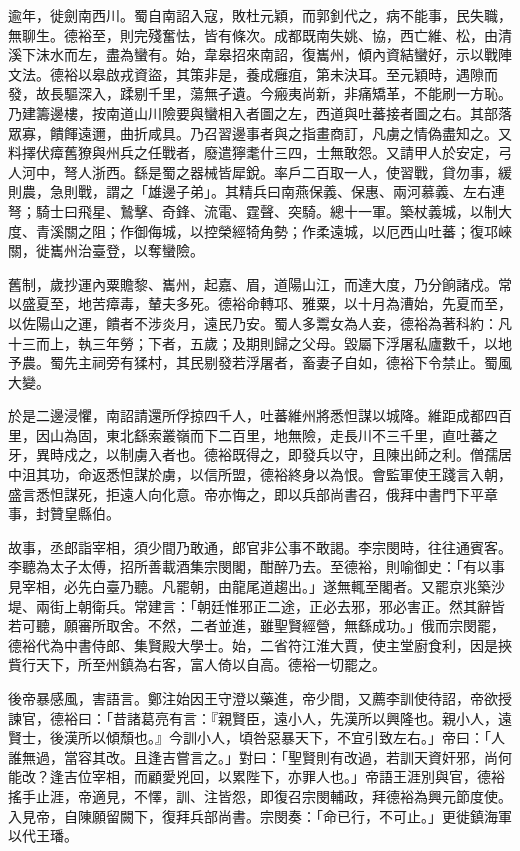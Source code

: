 \begin{pinyinscope}
 逾年，徙劍南西川。蜀自南詔入寇，敗杜元穎，而郭釗代之，病不能事，民失職，無聊生。德裕至，則完殘奮怯，皆有條次。成都既南失姚、協，西亡維、松，由清溪下沫水而左，盡為蠻有。始，韋皋招來南詔，復巂州，傾內資結蠻好，示以戰陣文法。德裕以皋啟戎資盜，其策非是，養成癰疽，第未決耳。至元穎時，遇隙而發，故長驅深入，蹂剔千里，蕩無孑遺。今瘢夷尚新，非痛矯革，不能刷一方恥。乃建籌邊樓，按南道山川險要與蠻相入者圖之左，西道與吐蕃接者圖之右。其部落眾寡，饋餫遠邇，曲折咸具。乃召習邊事者與之指畫商訂，凡虜之情偽盡知之。又料擇伏瘴舊獠與州兵之任戰者，廢遣獰耄什三四，士無敢怨。又請甲人於安定，弓人河中，弩人浙西。繇是蜀之器械皆犀銳。率戶二百取一人，使習戰，貸勿事，緩則農，急則戰，謂之「雄邊子弟」。其精兵曰南燕保義、保惠、兩河慕義、左右連弩；騎士曰飛星、鷙擊、奇鋒、流電、霆聲、突騎。總十一軍。築杖義城，以制大度、青溪關之阻；作御侮城，以控榮經犄角勢；作柔遠城，以厄西山吐蕃；復邛崍關，徙巂州治臺登，以奪蠻險。



 舊制，歲抄運內粟贍黎、巂州，起嘉、眉，道陽山江，而達大度，乃分餉諸戍。常以盛夏至，地苦瘴毒，輦夫多死。德裕命轉邛、雅粟，以十月為漕始，先夏而至，以佐陽山之運，饋者不涉炎月，遠民乃安。蜀人多鬻女為人妾，德裕為著科約：凡十三而上，執三年勞；下者，五歲；及期則歸之父母。毀屬下浮屠私廬數千，以地予農。蜀先主祠旁有猱村，其民剔發若浮屠者，畜妻子自如，德裕下令禁止。蜀風大變。



 於是二邊浸懼，南詔請還所俘掠四千人，吐蕃維州將悉怛謀以城降。維距成都四百里，因山為固，東北繇索叢嶺而下二百里，地無險，走長川不三千里，直吐蕃之牙，異時戍之，以制虜入者也。德裕既得之，即發兵以守，且陳出師之利。僧孺居中沮其功，命返悉怛謀於虜，以信所盟，德裕終身以為恨。會監軍使王踐言入朝，盛言悉怛謀死，拒遠人向化意。帝亦悔之，即以兵部尚書召，俄拜中書門下平章事，封贊皇縣伯。



 故事，丞郎詣宰相，須少間乃敢通，郎官非公事不敢謁。李宗閔時，往往通賓客。李聽為太子太傅，招所善載酒集宗閔閣，酣醉乃去。至德裕，則喻御史：「有以事見宰相，必先白臺乃聽。凡罷朝，由龍尾道趨出。」遂無輒至閣者。又罷京兆築沙堤、兩街上朝衛兵。常建言：「朝廷惟邪正二途，正必去邪，邪必害正。然其辭皆若可聽，願審所取舍。不然，二者並進，雖聖賢經營，無繇成功。」俄而宗閔罷，德裕代為中書侍郎、集賢殿大學士。始，二省符江淮大賈，使主堂廚食利，因是挾貲行天下，所至州鎮為右客，富人倚以自高。德裕一切罷之。



 後帝暴感風，害語言。鄭注始因王守澄以藥進，帝少間，又薦李訓使待詔，帝欲授諫官，德裕曰：「昔諸葛亮有言：『親賢臣，遠小人，先漢所以興隆也。親小人，遠賢士，後漢所以傾頹也。』今訓小人，頃咎惡暴天下，不宜引致左右。」帝曰：「人誰無過，當容其改。且逢吉嘗言之。」對曰：「聖賢則有改過，若訓天資奸邪，尚何能改？逢吉位宰相，而顧愛兇回，以累陛下，亦罪人也。」帝語王涯別與官，德裕搖手止涯，帝適見，不懌，訓、注皆怨，即復召宗閔輔政，拜德裕為興元節度使。入見帝，自陳願留闕下，復拜兵部尚書。宗閔奏：「命已行，不可止。」更徙鎮海軍以代王璠。




\end{pinyinscope}
